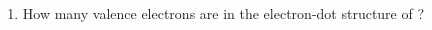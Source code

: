 \documentclass[main.tex]{subfiles}
\begin{document}
\begin{fullwidth}
\begin{multicols*}{2}
\begin{enumerate}
\item How many valence electrons are in the electron-dot structure of ?
\begin{enumerate}[label=(\alph*)]\vspace{-0.5cm}
\end{enumerate}\vspace{-0.5cm}

    \setcounter{enumTempD}{\theenumi}
\end{enumerate}
\end{multicols*}
\end{fullwidth}
\clearpage
\newpage
\thispagestyle{empty}
\end{document}

